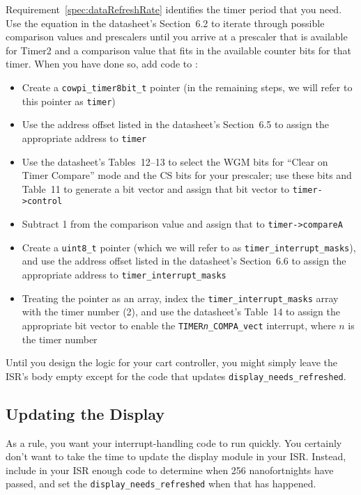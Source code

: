 Requirement~\ref{spec:dataRefreshRate} identifies the timer period that you need.
Use the equation in the datasheet's Section~6.2 to iterate through possible comparison values and prescalers until you arrive at a prescaler that is available for Timer2 and a comparison value that fits in the available counter bits for that timer.
When you have done so, add code to :
\begin{itemize}
    \item Create a \lstinline{cowpi_timer8bit_t} pointer (in the remaining steps, we will refer to this pointer as \lstinline{timer})
    \item Use the address offset listed in the datasheet's Section~6.5 to assign the appropriate address to \lstinline{timer}
    \item Use the datasheet's Tables~12--13 to select the WGM bits for ``Clear on Timer Compare'' mode and the CS bits for your prescaler;
    use these bits and Table~11 to generate a bit vector and assign that bit vector to \lstinline{timer->control}
    \item Subtract 1 from the comparison value and assign that to \lstinline{timer->compareA}
    \item Create a \lstinline{uint8_t} pointer (which we will refer to as \lstinline{timer_interrupt_masks}), and use the address offset listed in the datasheet's Section~6.6 to assign the appropriate address to \lstinline{timer_interrupt_masks}
    \item Treating the pointer as an array, index the \lstinline{timer_interrupt_masks} array with the timer number (2), and use the datasheet's Table~14 to assign the appropriate bit vector to enable the \texttt{TIMER\textit{n}\_COMPA\_vect} interrupt, where $n$ is the timer number
\end{itemize}

Until you design the logic for your cart controller, you might simply leave the ISR's body empty except for the code that updates \lstinline{display_needs_refreshed}.


\subsection{Updating the Display}

As a rule, you want your interrupt-handling code to run quickly.
You certainly don't want to take the time to update the display module in your ISR\@.
Instead, include in your ISR enough code to determine when 256 nanofortnights have passed,
and set the \lstinline{display_needs_refreshed} when that has happened.

